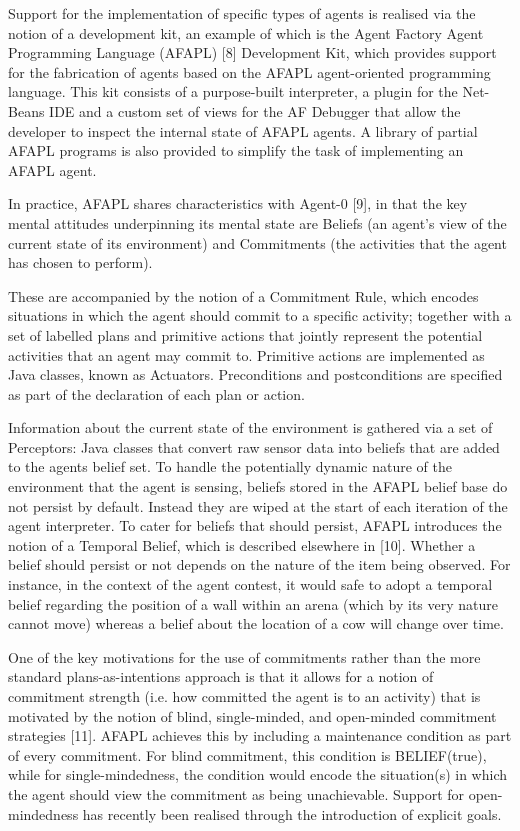 \documentclass[preprint]{sigplanconf} %
\begin{document}
Support for the implementation of specific types of agents is realised via
the notion of a development kit, an example of which is the Agent Factory
Agent Programming Language (AFAPL) [8] Development Kit, which provides
support for the fabrication of agents based on the AFAPL agent-oriented
programming language. This kit consists of a purpose-built interpreter, a
plugin for the Net-Beans IDE and a custom set of views for the AF Debugger
that allow the developer to inspect the internal state of AFAPL agents. A
library of partial AFAPL programs is also provided to simplify the task of
implementing an AFAPL agent.

In practice, AFAPL shares characteristics with Agent-0 [9], in that the key
mental attitudes underpinning its mental state are Beliefs (an agent's view
of the current state of its environment) and Commitments (the activities
that the agent has chosen to perform).

These are accompanied by the notion of a Commitment Rule, which encodes
situations in which the agent should commit to a specific activity; together
with a set of labelled plans and primitive actions that jointly represent the
potential activities that an agent may commit to. Primitive actions are
implemented as Java classes, known as Actuators. Preconditions and
postconditions are specified as part of the declaration of each plan or action.

Information about the current state of the environment is gathered via a set of
Perceptors: Java classes that convert raw sensor data into beliefs that are
added to the agents belief set. To handle the potentially dynamic nature of the
environment that the agent is sensing, beliefs stored in the AFAPL belief base
do not persist by default. Instead they are wiped at the start of each
iteration of the agent interpreter. To cater for beliefs that should persist,
AFAPL introduces the notion of a Temporal Belief, which is described elsewhere
in [10]. Whether a belief should persist or not depends on the nature of the
item being observed. For instance, in the context of the agent contest, it
would safe to adopt a temporal belief regarding the position of a wall within
an arena (which by its very nature cannot move) whereas a belief about the
location of a cow will change over time.

One of the key motivations for the use of commitments rather than the more
standard plans-as-intentions approach is that it allows for a notion of
commitment strength (i.e. how committed the agent is to an activity) that is
motivated by the notion of blind, single-minded, and open-minded commitment
strategies [11]. AFAPL achieves this by including a maintenance condition as
part of every commitment. For blind commitment, this condition is BELIEF(true),
while for single-mindedness, the condition would encode the situation(s) in
which the agent should view the commitment as being unachievable. Support for
open- mindedness has recently been realised through the introduction of
explicit goals.
\end{document}
